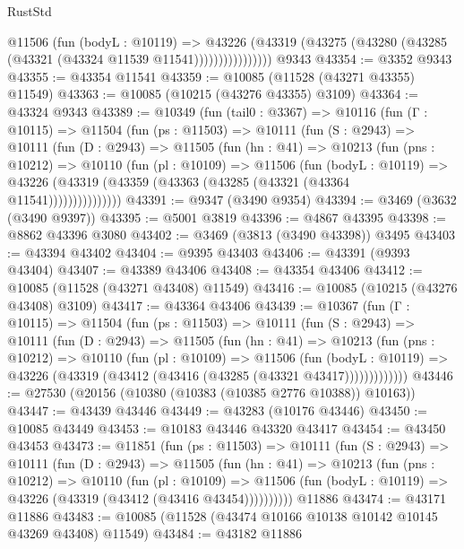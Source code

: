 \begin{lexlean}{RustStd}
\begin{coremodule}
                    @11506
                      (fun (bodyL : @10119) =>
                      @43226
                        (@43319
                          (@43275 (@43280 (@43285 (@43321 (@43324 @11539 @11541))))))))))))))))
    @9343
@43354 := @3352 @9343
@43355 := @43354 @11541
@43359 := @10085 (@11528 (@43271 @43355) @11549)
@43363 := @10085 (@10215 (@43276 @43355) @3109)
@43364 := @43324 @9343
@43389 := @10349
    (fun (tail0 : @3367) =>
    @10116
      (fun (Γ : @10115) =>
      @11504
        (fun (ps : @11503) =>
        @10111
          (fun (S : @2943) =>
          @10111
            (fun (D : @2943) =>
            @11505
              (fun (hn : @41) =>
              @10213
                (fun (pns : @10212) =>
                @10110
                  (fun (pl : @10109) =>
                  @11506
                    (fun (bodyL : @10119) =>
                    @43226 (@43319 (@43359 (@43363 (@43285 (@43321 (@43364 @11541)))))))))))))))
@43391 := @9347 (@3490 @9354)
@43394 := @3469 (@3632 (@3490 @9397))
@43395 := @5001 @3819
@43396 := @4867 @43395
@43398 := @8862 @43396 @3080
@43402 := @3469 (@3813 (@3490 @43398)) @3495
@43403 := @43394 @43402
@43404 := @9395 @43403
@43406 := @43391 (@9393 @43404)
@43407 := @43389 @43406
@43408 := @43354 @43406
@43412 := @10085 (@11528 (@43271 @43408) @11549)
@43416 := @10085 (@10215 (@43276 @43408) @3109)
@43417 := @43364 @43406
@43439 := @10367
    (fun (Γ : @10115) =>
    @11504
      (fun (ps : @11503) =>
      @10111
        (fun (S : @2943) =>
        @10111
          (fun (D : @2943) =>
          @11505
            (fun (hn : @41) =>
            @10213
              (fun (pns : @10212) =>
              @10110
                (fun (pl : @10109) =>
                @11506
                  (fun (bodyL : @10119) =>
                  @43226 (@43319 (@43412 (@43416 (@43285 (@43321 @43417)))))))))))))
@43446 := @27530 (@20156 (@10380 (@10383 (@10385 @2776 @10388)) @10163))
@43447 := @43439 @43446
@43449 := @43283 (@10176 @43446)
@43450 := @10085 @43449
@43453 := @10183 @43446 @43320 @43417
@43454 := @43450 @43453
@43473 := @11851
    (fun (ps : @11503) =>
    @10111
      (fun (S : @2943) =>
      @10111
        (fun (D : @2943) =>
        @11505
          (fun (hn : @41) =>
          @10213
            (fun (pns : @10212) =>
            @10110
              (fun (pl : @10109) =>
              @11506 (fun (bodyL : @10119) => @43226 (@43319 (@43412 (@43416 @43454))))))))))
    @11886
@43474 := @43171 @11886
@43483 := @10085 (@11528 (@43474 @10166 @10138 @10142 @10145 @43269 @43408) @11549)
@43484 := @43182 @11886

\end{coremodule}
\end{lexlean}

